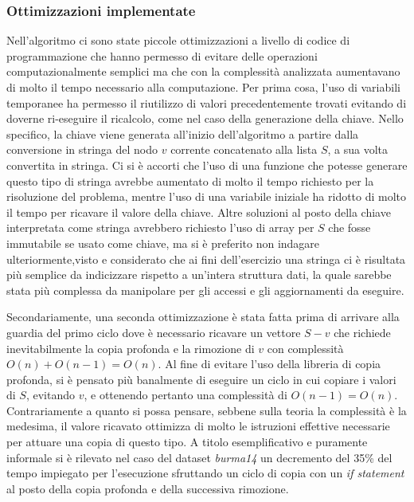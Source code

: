 \subsubsection{Ottimizzazioni implementate}

Nell'algoritmo ci sono state piccole ottimizzazioni a livello di codice di programmazione che hanno permesso di evitare delle operazioni computazionalmente semplici ma che con la complessità analizzata aumentavano di molto il tempo necessario alla computazione. Per prima cosa, l'uso di variabili temporanee ha permesso il riutilizzo di valori precedentemente trovati evitando di doverne ri-eseguire il ricalcolo, come nel caso della generazione della chiave. Nello specifico, la chiave viene generata all'inizio dell'algoritmo a partire dalla conversione in stringa del nodo \(v\) corrente concatenato alla lista \(S\), a sua volta convertita in stringa.
Ci si è accorti che l'uso di una funzione che potesse generare questo tipo di stringa avrebbe aumentato di molto il tempo richiesto per la risoluzione del problema, mentre l'uso di una variabile iniziale ha ridotto di molto il tempo per ricavare il valore della chiave.
Altre soluzioni al posto della chiave interpretata come stringa avrebbero richiesto l'uso di array per \(S\) che fosse immutabile se usato come chiave, ma si è preferito non indagare ulteriormente,visto e considerato che ai fini dell'esercizio una stringa ci è risultata più semplice da indicizzare rispetto a un'intera struttura dati, la quale sarebbe stata più complessa da manipolare per gli accessi e gli aggiornamenti da eseguire. 

Secondariamente, una seconda ottimizzazione è stata fatta prima di arrivare alla guardia del primo ciclo dove è necessario ricavare un vettore \(S - {v}\) che richiede inevitabilmente la copia profonda e la rimozione di \(v\) con complessità \(O(n) + O(n-1) = O(n)\). Al fine di evitare l'uso della libreria di copia profonda, si è pensato più banalmente di eseguire un ciclo in cui copiare i valori di \(S\), evitando \(v\), e ottenendo pertanto una complessità di \(O(n-1) = O(n)\). 
Contrariamente a quanto si possa pensare, sebbene sulla teoria la complessità è la medesima, il valore ricavato ottimizza di molto le istruzioni effettive necessarie per attuare una copia di questo tipo. A titolo esemplificativo e puramente informale si è rilevato nel caso del dataset \textit{burma14} un decremento del 35\% del tempo impiegato per l'esecuzione sfruttando un ciclo di copia con un \textit{if statement} al posto della copia profonda e della successiva rimozione. 


